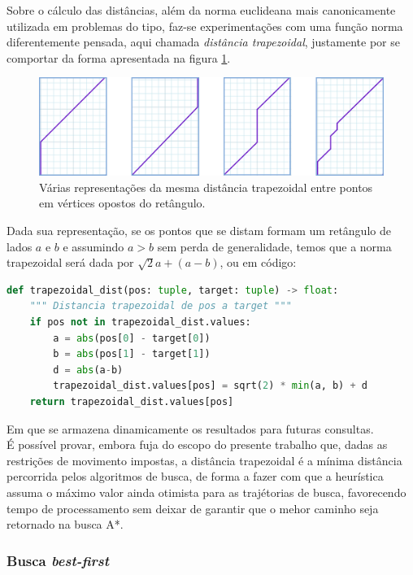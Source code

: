 \documentclass[12pt]{article}
\begin{document}
Sobre o cálculo das distâncias, além da norma euclideana mais canonicamente utilizada em problemas do tipo, faz-se experimentações com uma função norma diferentemente pensada, aqui chamada \emph{distância trapezoidal}, justamente por se comportar da forma apresentada na figura \ref{fig:trapezoidal}.

\begin{figure}[h!]
	\centering
	\label{fig:trapezoidal}
	\includegraphics[width=.9\textwidth]{trapezoidal}
	\caption{Várias representações da mesma distância trapezoidal entre pontos em vértices opostos do retângulo.}
\end{figure}

Dada sua representação, se os pontos que se distam formam um retângulo de lados \(a\) e \(b\) e assumindo \(a > b\) sem perda de generalidade, temos que a norma trapezoidal será dada por \(\sqrt{2}a + (a - b)\), ou em código:\\

\begin{lstlisting}[language=Python]
def trapezoidal_dist(pos: tuple, target: tuple) -> float:
    """ Distancia trapezoidal de pos a target """
    if pos not in trapezoidal_dist.values:
        a = abs(pos[0] - target[0])
        b = abs(pos[1] - target[1])
        d = abs(a-b)
        trapezoidal_dist.values[pos] = sqrt(2) * min(a, b) + d
    return trapezoidal_dist.values[pos]
\end{lstlisting}

Em que se armazena dinamicamente os resultados para futuras consultas.\\

É possível provar, embora fuja do escopo do presente trabalho que, dadas as restrições de movimento impostas, a distância trapezoidal é a mínima distância percorrida pelos algoritmos de busca, de forma a fazer com que a heurística assuma o máximo valor ainda otimista para as trajétorias de busca, favorecendo tempo de processamento sem deixar de garantir que o mehor caminho seja retornado na busca A*.

\subsubsection{Busca \emph{best-first}}
\end{document}
